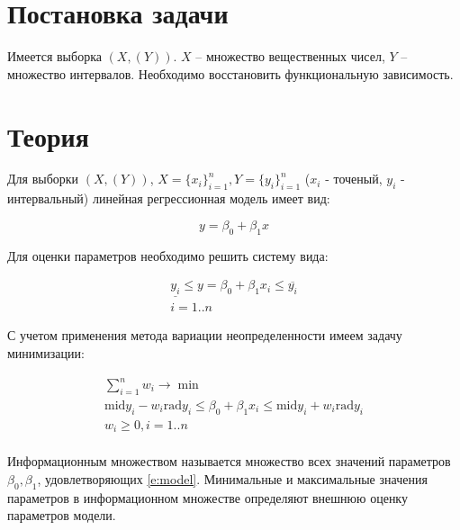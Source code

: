 \documentclass[a4paper,12pt]{article}
\begin{document}
    
    \newpage

    \tableofcontents
    \listoffigures
    \newpage

    \section{Постановка задачи}
    \quad Имеется выборка $ (X, (Y)) $. $ X $ -- множество вещественных чисел,
    $ Y $ -- множество интервалов. Необходимо восстановить функциональную зависимость.
    
    \section{Теория}
    \quad Для выборки $ (X, (Y))$, $ X = \{x_i\}_{i=1}^{n}, {Y} = \{{y}_i\}_{i=1}^{n} $
    ($ x_i $ - точеный, $ {y}_i $ - интервальный) линейная регрессионная модель имеет вид:

    \begin{equation}
        y = \beta_0 + \beta_1 x
        \label{e:model}
    \end{equation}

    Для оценки параметров необходимо решить систему вида:

    \begin{equation}
        \begin{gathered}
        \underline{y_i} \leq  y = \beta_0 + \beta_1 x_i \leq \overline{y_i} \\
        i = 1..n
        \end{gathered}
    \end{equation}

    С учетом применения метода вариации неопределенности имеем задачу минимизации:

    \begin{equation}
        \begin{gathered}
            \sum_{i = 1}^{n}w_{i} \to \min \\
            \text{mid}{y}_{i} - w_{i} \text{rad}{y}_{i} \leq \beta_0 + \beta_1 x_i \leq \text{mid}{y}_{i} + w_{i} \text{rad}{y}_{i} \\
            w_{i} \geq 0, i = 1..n \\
        \end{gathered}
    \end{equation}

    \quad Информационным множеством называется множество всех значений параметров
    $ \beta_0, \beta_1 $, удовлетворяющих \ref{e:model}. Минимальные и максимальные значения
    параметров в информационном множестве определяют внешнюю оценку параметров модели.
\end{document}
